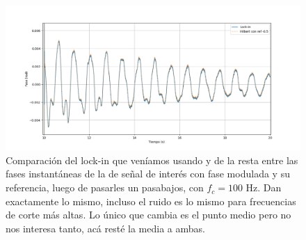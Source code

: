 \begin{figure}[th!]
	\centering
	\includegraphics[width=0.87\linewidth]{Figures/30_06_2025/Hilbert_como_lock_in}
	\caption{Comparación del lock-in que veníamos usando y de la resta entre las fases instantáneas de la de señal de interés con fase modulada y su referencia, luego de pasarles un pasabajos, con $f_c=100$ Hz. Dan exactamente lo mismo, incluso el ruido es lo mismo para frecuencias de corte más altas. Lo único que cambia es el punto medio pero no nos interesa tanto, acá resté la media a ambas.} %
	\label{fig:hilbertcomolockin}
\end{figure}
